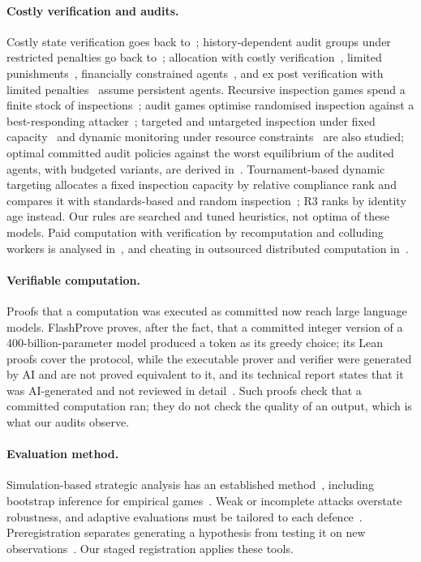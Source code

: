 \documentclass[11pt]{article}
\begin{document}
\paragraph{Costly verification and audits.} Costly state verification goes back to~\cite{townsend1979optimal}; history-dependent audit groups under restricted penalties go back to~\cite{harrington1988enforcement}; allocation with costly verification~\cite{benporath2014optimal}, limited punishments~\cite{li2020mechanism}, financially constrained agents~\cite{li2021financially}, and ex post verification with limited penalties~\cite{mylovanov2017optimal} assume persistent agents. Recursive inspection games spend a finite stock of inspections~\cite{vonstengel2016recursive}; audit games optimise randomised inspection against a best-responding attacker~\cite{blocki2013audit}; targeted and untargeted inspection under fixed capacity~\cite{liu2013enforcement} and dynamic monitoring under resource constraints~\cite{solan2021dynamic} are also studied; optimal committed audit policies against the worst equilibrium of the audited agents, with budgeted variants, are derived in~\cite{das2026optimally}. Tournament-based dynamic targeting allocates a fixed inspection capacity by relative compliance rank and compares it with standards-based and random inspection~\cite{gilpatric2015competition}; R3 ranks by identity age instead. Our rules are searched and tuned heuristics, not optima of these models. Paid computation with verification by recomputation and colluding workers is analysed in~\cite{fernandezanta2015algorithmic}, and cheating in outsourced distributed computation in~\cite{golle2001uncheatable}.

\paragraph{Verifiable computation.} Proofs that a computation was executed as committed now reach large language models. FlashProve proves, after the fact, that a committed integer version of a 400-billion-parameter model produced a token as its greedy choice; its Lean proofs cover the protocol, while the executable prover and verifier were generated by AI and are not proved equivalent to it, and its technical report states that it was AI-generated and not reviewed in detail~\cite{rinberg2026flashprove}. Such proofs check that a committed computation ran; they do not check the quality of an output, which is what our audits observe.

\paragraph{Evaluation method.} Simulation-based strategic analysis has an established method~\cite{wellman2006methods,wellman2025egta}, including bootstrap inference for empirical games~\cite{wiedenbeck2014bootstrap}. Weak or incomplete attacks overstate robustness, and adaptive evaluations must be tailored to each defence~\cite{carlini2019evaluating,tramer2020adaptive}. Preregistration separates generating a hypothesis from testing it on new observations~\cite{nosek2018preregistration}. Our staged registration applies these tools.
\end{document}
